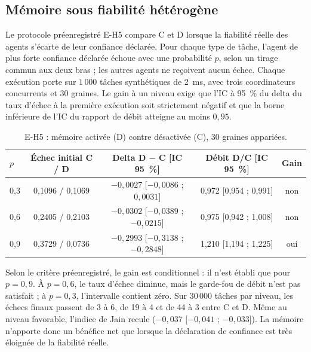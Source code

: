 
\subsection{Mémoire sous fiabilité hétérogène}
\label{sec:e-h5}

Le protocole préenregistré E-H5 compare C et D lorsque la fiabilité réelle des agents s'écarte de leur confiance déclarée. Pour chaque type de tâche, l'agent de plus forte confiance déclarée échoue avec une probabilité $p$, selon un tirage commun aux deux bras ; les autres agents ne reçoivent aucun échec. Chaque exécution porte sur $1\,000$ tâches synthétiques de 2~ms, avec trois coordinateurs concurrents et 30 graines. Le gain à un niveau exige que l'IC à 95~\% du delta du taux d'échec à la première exécution soit strictement négatif et que la borne inférieure de l'IC du rapport de débit atteigne au moins $0{,}95$.

\begin{table}[H]
\centering
\caption{E-H5 : mémoire activée (D) contre désactivée (C), 30 graines appariées. }
\label{tab:e-h5}
\footnotesize
\setlength{\tabcolsep}{4pt}
\begin{tabular}{lcccc}
\toprule
$p$ & \textbf{Échec initial C / D} & \textbf{Delta D $-$ C [IC 95~\%]} & \textbf{Débit D/C [IC 95~\%]} & \textbf{Gain} \\
\midrule
0,3 & 0,1096 / 0,1069 & $-0{,}0027$ [$-0{,}0086$ ; $0{,}0031$] & 0,972 [0,954 ; 0,991] & non \\
0,6 & 0,2405 / 0,2103 & $-0{,}0302$ [$-0{,}0389$ ; $-0{,}0215$] & 0,975 [0,942 ; 1,008] & non \\
0,9 & 0,3729 / 0,0736 & $-0{,}2993$ [$-0{,}3138$ ; $-0{,}2848$] & 1,210 [1,194 ; 1,225] & oui \\
\bottomrule
\end{tabular}
\end{table}

Selon le critère préenregistré, le gain est conditionnel : il n'est établi que pour $p = 0{,}9$. À $p = 0{,}6$, le taux d'échec diminue, mais le garde-fou de débit n'est pas satisfait ; à $p = 0{,}3$, l'intervalle contient zéro. Sur $30\,000$ tâches par niveau, les échecs finaux passent de 3 à 6, de 19 à 4 et de 44 à 3 entre C et D. Même au niveau favorable, l'indice de Jain recule ($-0{,}037$ [$-0{,}041$ ; $-0{,}033$]). La mémoire n'apporte donc un bénéfice net que lorsque la déclaration de confiance est très éloignée de la fiabilité réelle.

